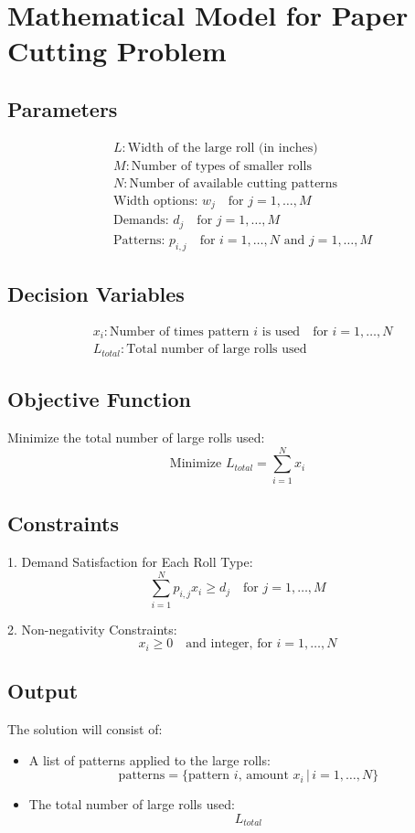\documentclass{article}
\begin{document}
\section*{Mathematical Model for Paper Cutting Problem}

\subsection*{Parameters}
\begin{align*}
& L: \text{Width of the large roll} \text{ (in inches)} \\
& M: \text{Number of types of smaller rolls} \\
& N: \text{Number of available cutting patterns} \\
& \text{Width options: } w_j \quad \text{for } j = 1, \ldots, M \\
& \text{Demands: } d_j \quad \text{for } j = 1, \ldots, M \\
& \text{Patterns: } p_{i,j} \quad \text{for } i = 1, \ldots, N \text{ and } j = 1, \ldots, M
\end{align*}

\subsection*{Decision Variables}
\begin{align*}
& x_i: \text{Number of times pattern } i \text{ is used} \quad \text{for } i = 1, \ldots, N \\
& L_{total}: \text{Total number of large rolls used}
\end{align*}

\subsection*{Objective Function}
Minimize the total number of large rolls used:
\[
\text{Minimize } L_{total} = \sum_{i=1}^{N} x_i
\]

\subsection*{Constraints}
1. Demand Satisfaction for Each Roll Type:
\[
\sum_{i=1}^{N} p_{i,j} x_i \geq d_j \quad \text{for } j = 1, \ldots, M
\]

2. Non-negativity Constraints:
\[
x_i \geq 0 \quad \text{and integer, for } i = 1, \ldots, N
\]

\pagebreak

\subsection*{Output}
The solution will consist of:
\begin{itemize}
    \item A list of patterns applied to the large rolls:
    \[
    \text{patterns} = \{ \text{pattern } i \text{, amount } x_i \, | \, i = 1, \ldots, N \}
    \]
    \item The total number of large rolls used:
    \[
    L_{total}
    \]
\end{itemize}
\end{document}
